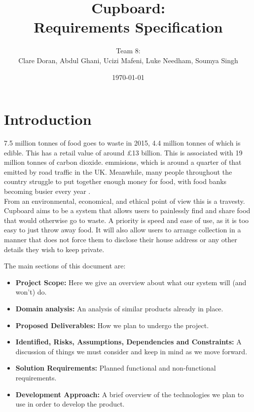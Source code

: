 \documentclass[12pt]{article}
\title{Cupboard:\\Requirements Specification}
\author{Team 8:\\Clare Doran, Abdul Ghani, Ucizi Mafeni, Luke Needham, Soumya Singh}
\date{\today}
\begin{document}
\maketitle

\tableofcontents
\clearpage


\section{Introduction}

7.5 million tonnes of food goes to waste in 2015, 4.4 million tonnes of which is edible.
This has a retail value of around £13 billion. This is associated with 19 million tonnes of carbon dioxide.
emmisions, which is around a quarter of that emitted by road traffic in the UK\cite{wrap}.
Meanwhile,  many people throughout the country struggle to put together enough 
money for food, with food banks becoming busier every year \cite{trussel}.\\
From an environmental, economical, and ethical point of view this is a travesty.\\
Cupboard aims to be a system that allows users to painlessly find and share food
that would otherwise go to waste. A priority is speed and ease of use, as it is
too easy to just throw away food. 
It will also allow users to arrange collection in a manner that does not force
them to disclose their house address or any other details they wish to keep
private.

The main sections of this document are:
\begin{itemize}
	\item \textbf{Project Scope:} Here we give an overview about what our system will (and won't) do.
	\item \textbf{Domain analysis:} An analysis of similar products already in place.
	\item \textbf{Proposed Deliverables:} How we plan to undergo the project.
	\item \textbf{Identified, Risks, Assumptions, Dependencies and Constraints:}
        A discussion of things we must consider and keep in mind as we move forward.
	\item \textbf{Solution Requirements:} Planned functional and non-functional requirements.
	\item \textbf{Development Approach:} A brief overview of the technologies we plan to use in order to develop the product.
\end{itemize}
\end{document}
